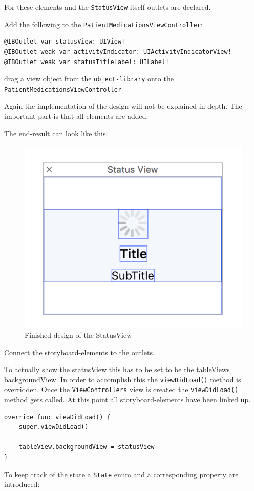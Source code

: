 \documentclass{article}
\begin{document}
For these elements and the \texttt{StatusView} itself outlets are declared.

Add the following to the \texttt{PatientMedicationsViewController}:

\begin{verbatim}
@IBOutlet var statusView: UIView!
@IBOutlet weak var activityIndicator: UIActivityIndicatorView!
@IBOutlet weak var statusTitleLabel: UILabel!
\end{verbatim}
drag a view object from the \texttt{object-library} onto the
\texttt{PatientMedicationsViewController}

Again the implementation of the design will not be explained in depth.
The important part is that all elements are added.

The end-result can look like this:

\begin{figure}[H]
\centering
\includegraphics{resources/step6/statusview.png}
\caption{Finished design of the StatusView}
\label{fig:statusview}
\end{figure}
Connect the storyboard-elements to the outlets.

To actually show the statusView this has to be set to be the tableViews
backgroundView. In order to accomplish this the \texttt{viewDidLoad()}
method is overridden. Once the \texttt{ViewControllers} view is created
the \texttt{viewDidLoad()} method gets called. At this point all
storyboard-elements have been linked up.

\begin{verbatim}
override func viewDidLoad() {
    super.viewDidLoad()

    tableView.backgroundView = statusView
}
\end{verbatim}
To keep track of the state a \texttt{State} enum and a corresponding
property are introduced:
\end{document}
